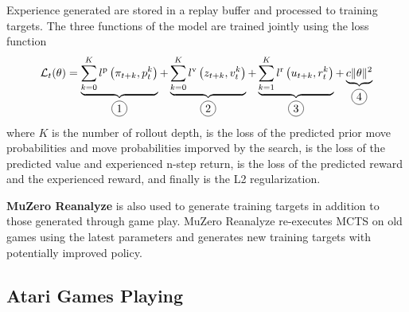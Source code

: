Experience generated are stored in a replay buffer and processed to training targets.
The three functions of the model are trained jointly using the loss function
\begin{equation}
    \mathcal{L}_{t}(\theta)=
    \underbrace{\sum_{k=0}^{K} l^{\mathrm{p}}\left(\pi_{t+k}, p_{t}^{k}\right)}_{\circled{1}}
    +
    \underbrace{\sum_{k=0}^{K} l^{\mathrm{v}}\left(z_{t+k}, v_{t}^{k}\right)}_{\circled{2}}
    +
    \underbrace{\sum_{k=1}^{K} l^{\mathrm{r}}\left(u_{t+k}, r_{t}^{k}\right)}_{\circled{3}}
    +
    \underbrace{c\|\theta\|^{2}}_{\circled{4}}
\end{equation}
where $K$ is the number of rollout depth,  is the loss of the predicted prior move probabilities and move probabilities imporved by the search,  is the loss of the predicted value and experienced n-step return,
 is the loss of the predicted reward and the experienced reward, and finally  is the L2 regularization.

\textbf{MuZero Reanalyze} is also used to generate training targets in addition to those generated through game play.
MuZero Reanalyze re-executes MCTS on old games using the latest parameters and generates new training targets with potentially improved policy.

\subsection{Atari Games Playing}
